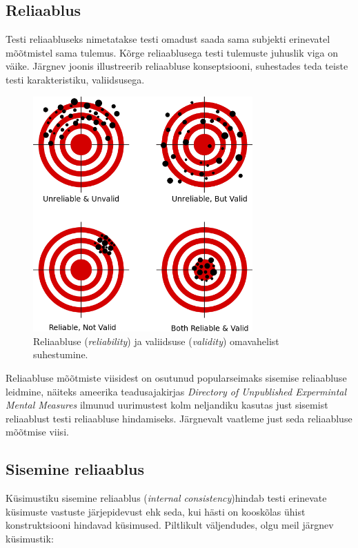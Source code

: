 \documentclass[a4paper]{article}
\begin{document}
\subsection{Reliaablus}
Testi reliaabluseks nimetatakse testi omadust saada sama subjekti erinevatel mõõtmistel sama tulemus. Kõrge reliaablusega testi tulemuste juhuslik viga on väike. Järgnev joonis illustreerib reliaabluse konseptsiooni, suhestades teda teiste testi karakteristiku, valiidsusega.

\begin{figure}[H]
\centering
\includegraphics[width=0.75\textwidth, height = 0.8\textwidth]{Reliability_and_validity.png}
\caption{Reliaabluse (\textit{reliability}) ja valiidsuse (\textit{validity}) omavahelist suhestumine.  \cite{Dilmen2008}}
\label{reliability_and_validity}
\end{figure}

Reliaabluse mõõtmiste viisidest on osutunud popularseimaks sisemise reliaabluse leidmine, näiteks ameerika teadusajakirjas \textit{Directory of Unpublished Expermintal Mental Measures} ilmunud uurimustest kolm neljandiku kasutas just sisemist reliaablust testi reliaabluse hindamiseks.\cite[177] {Henson2001} Järgnevalt vaatleme just seda reliaabluse mõõtmise viisi. 


\subsection{Sisemine reliaablus}

K\"usimustiku sisemine reliaablus (\textit{internal consistency})hindab testi erinevate k\"usimuste vastuste järjepidevust ehk seda, kui hästi on kooskõlas \"uhist  konstruktsiooni hindavad k\"usimused.\cite[177] {Henson2001} Piltlikult väljendudes, olgu meil järgnev k\"usimustik: 
\end{document}
